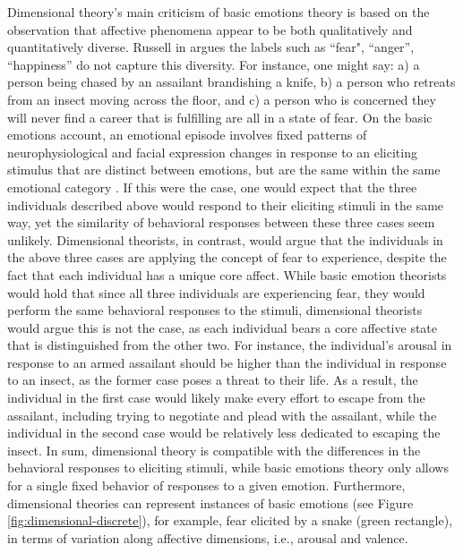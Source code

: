 \documentclass[11pt]{article}
\begin{document}
Dimensional theory's main criticism of basic emotions theory is based on the
observation that affective phenomena appear to be both qualitatively and
quantitatively diverse. Russell in \cite{russell:core-affect} argues the labels
such as ``fear", ``anger'', ``happiness'' do not capture this diversity. For
instance, one might say: a) a person being chased by an assailant brandishing a
knife, b) a person who retreats from an insect moving across the floor, and
c) a person who is concerned they will never find a career that is
fulfilling are all in a state of fear. On the basic emotions account, an
emotional episode involves fixed patterns of neurophysiological and facial
expression changes in response to an eliciting stimulus that are distinct
between emotions, but are the same within the same emotional category
\cite{ekman:argument-emotions}. If this were the case, one would expect that the
three individuals described above would respond to their eliciting stimuli in
the same way, yet the similarity of behavioral responses between these three
cases seem unlikely. Dimensional theorists, in contrast, would argue that the
individuals in the above three cases are applying the concept of fear to
experience, despite the fact that each individual has a unique core affect.
While basic emotion theorists would hold that since all three individuals are
experiencing fear, they would perform the same behavioral responses to the
stimuli, dimensional theorists would argue this is not the case, as each
individual bears a core affective state that is distinguished from the other
two. For instance, the individual's arousal in response to an armed assailant
should be higher than the individual in response to an insect, as the former
case poses a threat to their life. As a result, the individual in the first case
would likely make every effort to escape from the assailant, including trying to
negotiate and plead with the assailant, while the individual in the second case
would be relatively less dedicated to escaping the insect. In sum, dimensional
theory is compatible with the differences in the behavioral responses to
eliciting stimuli, while basic emotions theory only allows for a single fixed
behavior of responses to a given emotion. Furthermore, dimensional theories can
represent instances of basic emotions (see Figure
\ref{fig:dimensional-discrete}), for example, fear elicited by a snake (green
rectangle), in terms of variation along affective dimensions, i.e., arousal and
valence.
\end{document}

